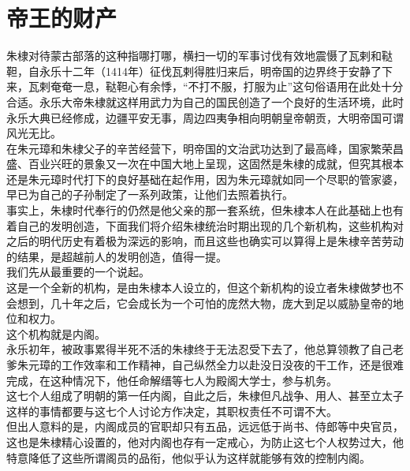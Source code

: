 \section{帝王的财产}
\ifnum{}
	\begin{multicols}{\theparacolNo}
\fi
朱棣对待蒙古部落的这种指哪打哪，横扫一切的军事讨伐有效地震慑了瓦剌和鞑靼，自永乐十二年（1414年）征伐瓦剌得胜归来后，明帝国的边界终于安静了下来，瓦剌奄奄一息，鞑靼心有余悸，“不打不服，打服为止”这句俗语用在此处十分合适。永乐大帝朱棣就这样用武力为自己的国民创造了一个良好的生活环境，此时永乐大典已经修成，边疆平安无事，周边四夷争相向明朝皇帝朝贡，大明帝国可谓风光无比。\\

在朱元璋和朱棣父子的辛苦经营下，明帝国的文治武功达到了最高峰，国家繁荣昌盛、百业兴旺的景象又一次在中国大地上呈现，这固然是朱棣的成就，但究其根本还是朱元璋时代打下的良好基础在起作用，因为朱元璋就如同一个尽职的管家婆，早已为自己的子孙制定了一系列政策，让他们去照着执行。\\

事实上，朱棣时代奉行的仍然是他父亲的那一套系统，但朱棣本人在此基础上也有着自己的发明创造，下面我们将介绍朱棣统治时期出现的几个新机构，这些机构对之后的明代历史有着极为深远的影响，而且这些也确实可以算得上是朱棣辛苦劳动的结果，是超越前人的发明创造，值得一提。\\

我们先从最重要的一个说起。\\

这是一个全新的机构，是由朱棣本人设立的，但这个新机构的设立者朱棣做梦也不会想到，几十年之后，它会成长为一个可怕的庞然大物，庞大到足以威胁皇帝的地位和权力。\\

这个机构就是内阁。\\

永乐初年，被政事累得半死不活的朱棣终于无法忍受下去了，他总算领教了自己老爹朱元璋的工作效率和工作精神，自己纵然全力以赴没日没夜的干工作，还是很难完成，在这种情况下，他任命解缙等七人为殿阁大学士，参与机务。\\

这七个人组成了明朝的第一任内阁，自此之后，朱棣但凡战争、用人、甚至立太子这样的事情都要与这七个人讨论方作决定，其职权责任不可谓不大。\\

但出人意料的是，内阁成员的官职却只有五品，远远低于尚书、侍郎等中央官员，这也是朱棣精心设置的，他对内阁也存有一定戒心，为防止这七个人权势过大，他特意降低了这些所谓阁员的品衔，他似乎认为这样就能够有效的控制内阁。\\


\end{multicols}
